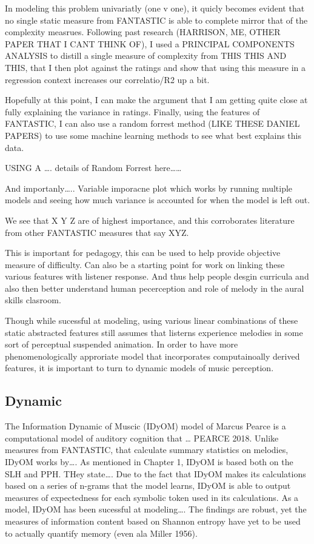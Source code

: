 \documentclass[]{book}
\begin{document}
In modeling this problem univariatly (one v one), it quicly becomes evident that no single static measure from FANTASTIC is able to complete mirror that of the complexity measrues.
Following past research (HARRISON, ME, OTHER PAPER THAT I CANT THINK OF), I used a PRINCIPAL COMPONENTS ANALYSIS to distill a single measure of complexity from THIS THIS AND THIS, that I then plot against the ratings and show that using this measure in a regression context increases our correlatio/R2 up a bit.

Hopefully at this point, I can make the argument that I am getting quite close at fully explaining the variance in ratings.
Finally, using the features of FANTASTIC, I can also use a random forrest method (LIKE THESE DANIEL PAPERS) to use some machine learning methods to see what best explains this data.

USING A \ldots{}. details of Random Forrest here\ldots{}\ldots{}

And importanly\ldots{}.. Variable imporacne plot which works by running multiple models and seeing how much variance is accounted for when the model is left out.

We see that X Y Z are of highest importance, and this corroborates literature from other FANTASTIC measures that say XYZ.

This is important for pedagogy, this can be used to help provide objective measure of difficulty.
Can also be a starting point for work on linking these various features with listener response.
And thus help people desgin curricula and also then better understand human pecerception and role of melody in the aural skills clasroom.

Though while sucessful at modeling, using various linear combinations of these static abstracted features still assumes that listerns experience melodies in some sort of perceptual suspended animation.
In order to have more phenomenologically approriate model that incorporates computainoally derived features, it is important to turn to dynamic models of music perception.

\hypertarget{dynamic-1}{%
\subsection{Dynamic}\label{dynamic-1}}

The Information Dynamic of Muscic (IDyOM) model of Marcus Pearce is a computational model of auditory cognition that \ldots{} PEARCE 2018.
Unlike measures from FANTASTIC, that calculate summary statistics on melodies, IDyOM works by\ldots{}.
As mentioned in Chapter 1, IDyOM is based both on the SLH and PPH.
THey state\ldots{}.
Due to the fact that IDyOM makes its calculations based on a series of n-grams that the model learns, IDyOM is able to output measures of expectedness for each symbolic token used in its calculations.
As a model, IDyOM has been sucessful at modeling\ldots{}.
The findings are robust, yet the measures of information content based on Shannon entropy have yet to be used to actually quantify memory (even ala Miller 1956).
\end{document}
